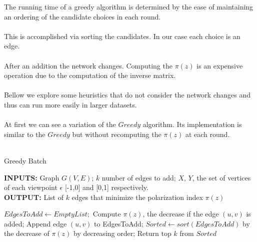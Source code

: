 The running time of a greedy algorithm is determined by the ease of maintaining an ordering of the candidate choices in each round. 
\\
\\
This is accomplished via sorting the candidates. In our case each choice is an edge. 
\\
\\
After an addition the network changes. Computing the $\pi(z)$ is an expensive operation due to the computation of the inverse matrix.
\\
\\
Bellow we explore some heuristics that do not consider the network changes and thus can run more easily in larger datasets.
\\
\\
At first we can see a variation of the $Greedy$ algorithm. Its implementation is similar to the $Greedy$ but without recomputing the  $\pi(z)$ at each round.
\\
\\
\begin{algorithm}[H]
		
			\caption{Greedy Batch}
			\label{alg:greedyBatch}
			
			\begin{flushleft}
        				\textbf{INPUTS:} Graph $G(V, E)$; $k$ number of edges to add;
				$X$, $Y $, the set of vertices of each viewpoint $\epsilon$ [-1,0] and [0,1] respectively.\\
				\vspace{6pt}
        				\textbf{OUTPUT:} List of $k$ edges that minimize the polarization index $\pi(z)$
			\end{flushleft}
			
			\begin{algorithmic}[1]
				\STATE $EdgesToAdd \leftarrow Empty List;$
					\STATE Compute $\pi(z)$, the decrease if the edge $(u,v)$ is added;
					\STATE Append edge $(u,v)$ to EdgesToAdd;
				\ENDFOR
				\STATE $Sorted \leftarrow sort(EdgesToAdd)$ by the decrease of $\pi(z)$ by decreasing order;
				\STATE Return top $k$ from $Sorted$
			\end{algorithmic}
			
		\end{algorithm}

